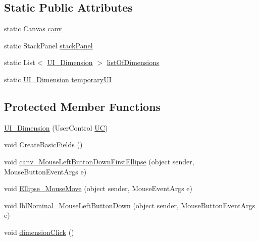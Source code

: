 \subsection*{Static Public Attributes}
\begin{DoxyCompactItemize}
\item 
static Canvas \mbox{\hyperlink{class_dimension___chain_1_1_u_i___dimension_ab1481e824605880527852c9c0827f1cd}{canv}}
\item 
static Stack\+Panel \mbox{\hyperlink{class_dimension___chain_1_1_u_i___dimension_a4285006e5a9e3ce55d81cd1d4cb56845}{stack\+Panel}}
\item 
static List$<$ \mbox{\hyperlink{class_dimension___chain_1_1_u_i___dimension}{U\+I\+\_\+\+Dimension}} $>$ \mbox{\hyperlink{class_dimension___chain_1_1_u_i___dimension_a4186c0c50764c0bd5d6984cce1591777}{list\+Of\+Dimensions}}
\item 
static \mbox{\hyperlink{class_dimension___chain_1_1_u_i___dimension}{U\+I\+\_\+\+Dimension}} \mbox{\hyperlink{class_dimension___chain_1_1_u_i___dimension_aa5261f63d4d25236736bb1bb5236da25}{temporary\+UI}}
\end{DoxyCompactItemize}
\subsection*{Protected Member Functions}
\begin{DoxyCompactItemize}
\item 
\mbox{\hyperlink{class_dimension___chain_1_1_u_i___dimension_acd224ad860f38ed89790f0e9aa1321d6}{U\+I\+\_\+\+Dimension}} (User\+Control \mbox{\hyperlink{class_dimension___chain_1_1_u_i___dimension_ade41252d28cea667eee14bad5bc1f9a2}{UC}})
\item 
void \mbox{\hyperlink{class_dimension___chain_1_1_u_i___dimension_af9e7104a0bc09e67b0e3813ee8304ca1}{Create\+Basic\+Fields}} ()
\item 
void \mbox{\hyperlink{class_dimension___chain_1_1_u_i___dimension_aec30a2016b40e83553447c125d08fb68}{canv\+\_\+\+Mouse\+Left\+Button\+Down\+First\+Ellipse}} (object sender, Mouse\+Button\+Event\+Args e)
\item 
void \mbox{\hyperlink{class_dimension___chain_1_1_u_i___dimension_aad45b98f4141f7d3d9e72f0b8fdb040a}{Ellipse\+\_\+\+Mouse\+Move}} (object sender, Mouse\+Event\+Args e)
\item 
void \mbox{\hyperlink{class_dimension___chain_1_1_u_i___dimension_a4a1641fcb5d2fc20fc410152f4995f1a}{lbl\+Nominal\+\_\+\+Mouse\+Left\+Button\+Down}} (object sender, Mouse\+Button\+Event\+Args e)
\item 
void \mbox{\hyperlink{class_dimension___chain_1_1_u_i___dimension_ad33eaa6648fd703b79a6cc0d966d8828}{dimension\+Click}} ()
\end{DoxyCompactItemize}
